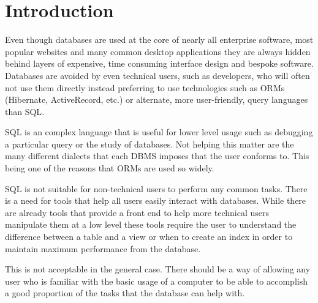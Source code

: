 \chapter{Introduction}

Even though databases are used at the core of nearly all enterprise software,
most popular websites and many common desktop applications they are always
hidden behind layers of expensive, time consuming interface design and bespoke
software. Databases are avoided by even technical users, such as developers,
who will often not use them directly instead preferring to use technologies
such as \acp{ORM} (Hibernate, ActiveRecord, etc.) or alternate, more
user-friendly, query languages than \ac{SQL}.

\ac{SQL} is an complex language that is useful for lower level usage such as
debugging a particular query or the study of databases. Not helping this matter
are the many different dialects that each \ac{DBMS} imposes that the user
conforms to. This being one of the reasons that \acp{ORM} are used so widely.

\ac{SQL} is not suitable for non-technical users to perform any common tasks.
There is a need for tools that help all users easily interact with databases.
While there are already tools that provide a front end to help more technical
users manipulate them at a low level these tools require the user to understand
the difference between a table and a view or when to create an index in order
to maintain maximum performance from the database.

This is not acceptable in the general case. There should be a way of allowing
any user who is familiar with the basic usage of a computer to be able to
accomplish a good proportion of the tasks that the database can help with.
